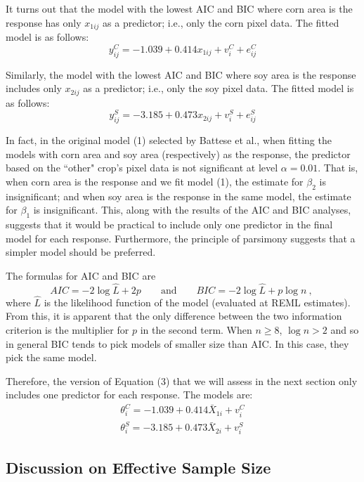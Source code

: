 \documentclass{article}
\begin{document}
It turns out that the model with the lowest AIC and BIC where corn area is the response has only $x_{1ij}$ as a predictor; i.e., only the corn pixel data. The fitted model is as follows:
\begin{equation}
y_{ij}^C=-1.039+0.414x_{1ij}+v_i^C+e_{ij}^C
\end{equation}

Similarly, the model with the lowest AIC and BIC where soy area is the response includes only $x_{2ij}$ as a predictor; i.e., only the soy pixel data. The fitted model is as follows:
\begin{equation}
y_{ij}^S=-3.185+0.473x_{2ij}+v_i^S+e_{ij}^S
\end{equation}

In fact, in the original model (1) selected by Battese et al., when fitting the models with corn area and soy area (respectively) as the response, the predictor based on the ``other" crop's pixel data is not significant at level $\alpha=0.01$. That is, when corn area is the response and we fit model (1), the estimate for $\beta_2$ is insignificant; and when soy area is the response in the same model, the estimate for $\beta_1$ is insignificant. This, along with the results of the AIC and BIC analyses, suggests that it would be practical to include only one predictor in the final model for each response. Furthermore, the principle of parsimony suggests that a simpler model should be preferred.
\medbreak

The formulas for AIC and BIC are
\[
AIC = -2\log \hat L + 2p \qquad \text{and} \qquad BIC = -2\log \hat L + p\log n\ ,\
\]
where $\hat L$ is the likelihood function of the model (evaluated at REML estimates). From this, it is apparent that the only difference between the two information criterion is the multiplier for $p$ in the second term. When $n\geq8$, $\log n > 2$ and so in general BIC tends to pick models of smaller size than AIC. In this case, they pick the same model.
\medbreak

Therefore, the version of Equation (3) that we will assess in the next section only includes one predictor for each response. The models are:
\begin{align}
\theta_i^C=-1.039+0.414\bar X_{1i}+v_i^C \\
\theta_i^S=-3.185+0.473\bar X_{2i}+v_i^S
\end{align}

\subsection{Discussion on Effective Sample Size}
\end{document}
